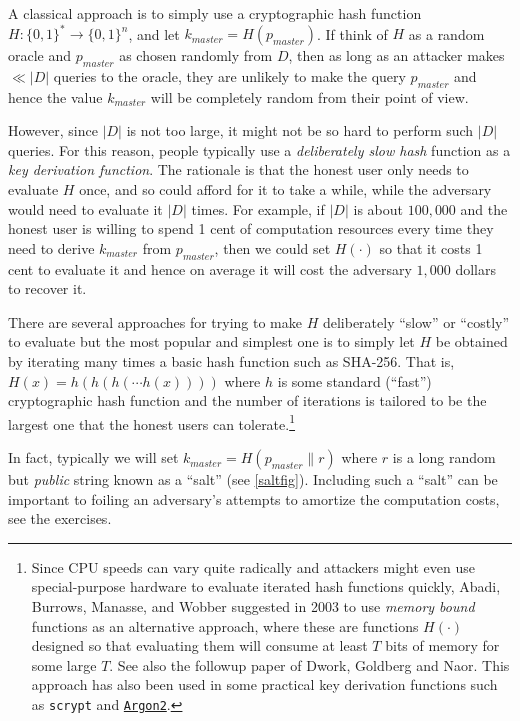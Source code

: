 A classical approach is to simply use a cryptographic hash function
\(H:\{0,1\}^*\rightarrow\{0,1\}^n\), and let
\(k_{master} = H(p_{master})\). If think of \(H\) as a random oracle and
\(p_{master}\) as chosen randomly from \(D\), then as long as an
attacker makes \(\ll |D|\) queries to the oracle, they are unlikely to
make the query \(p_{master}\) and hence the value \(k_{master}\) will be
completely random from their point of view.

However, since \(|D|\) is not too large, it might not be so hard to
perform such \(|D|\) queries. For this reason, people typically use a
\emph{deliberately slow hash} function as a \emph{key derivation
function}. The rationale is that the honest user only needs to evaluate
\(H\) once, and so could afford for it to take a while, while the
adversary would need to evaluate it \(|D|\) times. For example, if
\(|D|\) is about \(100,000\) and the honest user is willing to spend 1
cent of computation resources every time they need to derive
\(k_{master}\) from \(p_{master}\), then we could set \(H(\cdot)\) so
that it costs 1 cent to evaluate it and hence on average it will cost
the adversary \(1,000\) dollars to recover it.

There are several approaches for trying to make \(H\) deliberately
``slow'' or ``costly'' to evaluate but the most popular and simplest one
is to simply let \(H\) be obtained by iterating many times a basic hash
function such as SHA-256. That is, \(H(x)=h(h(h(\cdots h(x))))\) where
\(h\) is some standard (``fast'') cryptographic hash function and the
number of iterations is tailored to be the largest one that the honest
users can tolerate.\footnote{Since CPU speeds can vary quite radically
  and attackers might even use special-purpose hardware to evaluate
  iterated hash functions quickly, Abadi, Burrows, Manasse, and Wobber
  suggested in 2003 to use \emph{memory bound} functions as an
  alternative approach, where these are functions \(H(\cdot)\) designed
  so that evaluating them will consume at least \(T\) bits of memory for
  some large \(T\). See also the followup paper of Dwork, Goldberg and
  Naor. This approach has also been used in some practical key
  derivation functions such as \texttt{scrypt} and
  \href{https://password-hashing.net/argon2-specs.pdf}{\texttt{Argon2}}.}

In fact, typically we will set \(k_{master} = H(p_{master}\| r)\) where
\(r\) is a long random but \emph{public} string known as a ``salt'' (see
\cref{saltfig}). Including such a ``salt'' can be important to foiling
an adversary's attempts to amortize the computation costs, see the
exercises.

